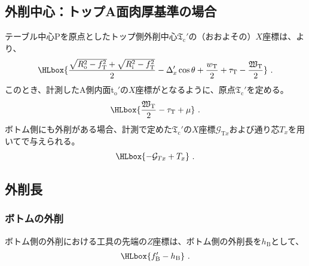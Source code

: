 \subsection{外削中心：トップA面肉厚基準の場合}
テーブル中心Pを原点としたトップ側外削中心$\mathfrak T_\mathrm c'$の（おおよその）$X$座標は、より、
\begin{align*}
  \HLbox{%
    \frac{\sqrt{R_\mathrm o^2-f_\mathrm T^2}+\sqrt{R_\mathrm i^2-f_\mathrm T^2}}2
    -\Delta_x'\cos\theta
    +\frac{w_\mathrm T}2
    +\tau_\mathrm T
    -\frac{\mathfrak W_\mathrm T}2
  }\ .
\end{align*}
このとき、計測したA側内面t$_\mathrm o'$の$X$座標がとなるように、原点$\mathfrak T_\mathrm c'$を定める。
\begin{align*}
  \HLbox{\frac{\mathfrak W_\mathrm T}2-\tau_\mathrm T+\mu}~.
\end{align*}
ボトム側にも外削がある場合、計測で定めた$\mathfrak T_\mathrm c'$の$X$座標$\mathcal G_{\mathrm Tx}$および通り芯$T_x$を用いてで与えられる。
\begin{align*}
  \HLbox{-\mathcal G_{Tx}+T_x}\ .
\end{align*}

\subsection{外削長}

\subsubsection{ボトムの外削}
ボトム側の外削における工具の先端の$Z$座標は、ボトム側の外削長を$h_\mathrm B$として、
\begin{align*}
  \HLbox{f_\mathrm B'-h_\mathrm B}\ .
\end{align*}


